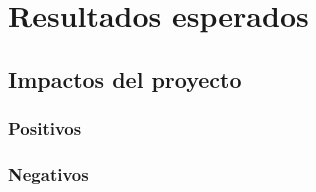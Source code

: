 \chapter{Resultados esperados}
\section{Impactos del proyecto}
\subsection*{Positivos}
\subsection*{Negativos}